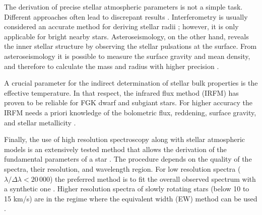 \documentclass{aa}
\begin{document}
The derivation of precise stellar atmospheric parameters is not a simple task.
Different approaches often lead to discrepant results
\citep[see e.g.][]{Santos13}. Interferometry is usually considered  an accurate
method for deriving stellar radii \citep[see e.g.][]{Boyajian2012}; however, it is
only applicable for bright nearby stars. Asteroseismology, on the other hand,
reveals the inner stellar structure by observing the stellar pulsations at the
surface. From asteroseismology it is possible to measure the surface gravity and
mean density, and therefore to calculate the mass and radius with higher
precision \citep[e.g.][]{Kjeldsen1995}.

A crucial parameter for the indirect determination of stellar bulk properties is
the effective temperature. In that respect, the infrared flux method (IRFM) has
proven to be reliable for FGK dwarf and subgiant stars. For higher accuracy the
IRFM needs a priori knowledge of the bolometric flux, reddening, surface
gravity, and stellar metallicity
\citep{Blackwell1977,Ramirez2005b,Casagrande2010}.

Finally, the use of high resolution spectroscopy along with stellar atmospheric
models is an extensively tested method that allows the derivation of the
fundamental parameters of a star \citep[see e.g.][]{Valenti2005,Santos13}. The
procedure depends on the quality of the spectra, their resolution, and
wavelength region. For low resolution spectra ($\lambda/\Delta\lambda <
20\,000$) the preferred method is to fit the overall observed spectrum with a
synthetic one \citep[see e.g.][]{Recio2006}. Higher resolution spectra of slowly
rotating stars (below 10 to 15 \si{km/s}) are in the regime where the
equivalent width (EW) method can be used
\citep[see e.g.][for details]{Andreasen2017a,Tsantaki2017}.
\end{document}
